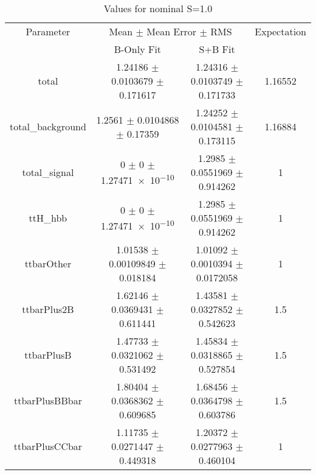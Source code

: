 \begin{table}
\centering
\caption{Values for nominal S=1.0}
\begin{tabular}{cccc}
\toprule
Parameter & \multicolumn{2}{c}{Mean $\pm$ Mean Error $\pm$ RMS} & Expectation\\
 & B-Only Fit & S+B Fit & \\
\midrule
total & \num{1.24186} $\pm$ \num{0.0103679} $\pm$ \num{0.171617} & \num{1.24316} $\pm$ \num{0.0103749} $\pm$ \num{0.171733} & \num{1.16552}\\
total\_background & \num{1.2561} $\pm$ \num{0.0104868} $\pm$ \num{0.17359} & \num{1.24252} $\pm$ \num{0.0104581} $\pm$ \num{0.173115} & \num{1.16884}\\
total\_signal & \num{0} $\pm$ \num{0} $\pm$ \num{1.27471e-10} & \num{1.2985} $\pm$ \num{0.0551969} $\pm$ \num{0.914262} & \num{1}\\
ttH\_hbb & \num{0} $\pm$ \num{0} $\pm$ \num{1.27471e-10} & \num{1.2985} $\pm$ \num{0.0551969} $\pm$ \num{0.914262} & \num{1}\\
ttbarOther & \num{1.01538} $\pm$ \num{0.00109849} $\pm$ \num{0.018184} & \num{1.01092} $\pm$ \num{0.0010394} $\pm$ \num{0.0172058} & \num{1}\\
ttbarPlus2B & \num{1.62146} $\pm$ \num{0.0369431} $\pm$ \num{0.611441} & \num{1.43581} $\pm$ \num{0.0327852} $\pm$ \num{0.542623} & \num{1.5}\\
ttbarPlusB & \num{1.47733} $\pm$ \num{0.0321062} $\pm$ \num{0.531492} & \num{1.45834} $\pm$ \num{0.0318865} $\pm$ \num{0.527854} & \num{1.5}\\
ttbarPlusBBbar & \num{1.80404} $\pm$ \num{0.0368362} $\pm$ \num{0.609685} & \num{1.68456} $\pm$ \num{0.0364798} $\pm$ \num{0.603786} & \num{1.5}\\
ttbarPlusCCbar & \num{1.11735} $\pm$ \num{0.0271447} $\pm$ \num{0.449318} & \num{1.20372} $\pm$ \num{0.0277963} $\pm$ \num{0.460104} & \num{1}\\
\bottomrule
\end{tabular}
\end{table}